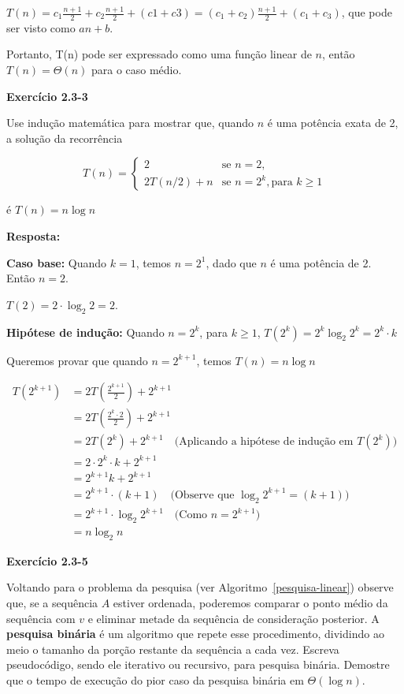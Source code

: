 \documentclass{article}
\begin{document}
    $T(n) = c_1 \frac{n+1}{2} + c_2 \frac{n+1}{2} + (c1 + c3) = (c_1 + c_2) \frac{n+1}{2} + (c_1 + c_3)$, que pode ser visto como $an + b$.
    
    Portanto, T(n) pode ser expressado como uma função linear de $n$, então $T(n) = \Theta(n)$ para o caso médio.

    \textbf{Exercício 2.3-3}

    Use indução matemática para mostrar que, quando $n$ é uma potência exata de 2, a solução da recorrência

    \[
    T(n) =
    \begin{cases}
        2 & \text{se } n = 2, \\
        2T(n/2) + n & \text{se } n = 2^k, \text{para $k \geq 1$}
    \end{cases}
    \]

    é $T(n) = n \log n$

    \textbf{Resposta:}

    \textbf{Caso base:} Quando $k = 1$, temos $n = 2^1$, dado que $n$ é uma potência de 2. Então $n = 2$.
    
    $T(2) = 2 \cdot \log_2 2 = 2 $.

    \textbf{Hipótese de indução:} Quando $n=2^k$, para $k \geq 1$, $T(2^k) = 2^k \log_2 2^k = 2^k \cdot k$

    Queremos provar que quando $n = 2^{k+1}$, temos $T(n) = n \log n$
    
    \begin{align}
    T(2^{k+1}) &= 2T\left(\frac{2^{k+1}}{2}\right) + 2^{k+1} \\
            &= 2T\left(\frac{2^k \cdot 2}{2}\right) + 2^{k+1} \\
            &= 2T(2^k) + 2^{k+1} \quad \text{(Aplicando a hipótese de indução em $T(2^k)$)} \\
            &= 2 \cdot 2^k \cdot k + 2^{k+1} \\
            &= 2^{k+1} k + 2^{k+1} \\
            &= 2^{k+1} \cdot (k + 1) \quad \text{(Observe que $\log_2 2^{k+1} = (k+1)$)} \\ 
            &= 2^{k+1} \cdot \log_2 2^{k+1} \quad \text{(Como $n = 2^{k+1}$)}\\
            &= n \log_2 n 
    \end{align}


    \textbf{Exercício 2.3-5}

    Voltando para o problema da pesquisa (ver Algoritmo~\ref{pesquisa-linear}) observe que, se a sequência $A$ estiver ordenada, poderemos comparar o ponto médio da sequência com $v$ e eliminar metade da sequência de consideração posterior. A \textbf{pesquisa binária} é um algoritmo que repete esse procedimento, dividindo ao meio o tamanho da porção restante da sequência a cada vez. Escreva pseudocódigo, sendo ele iterativo ou recursivo, para pesquisa binária. Demostre que o tempo de execução do pior caso da pesquisa binária em $\Theta(\log n)$.
\end{document}
